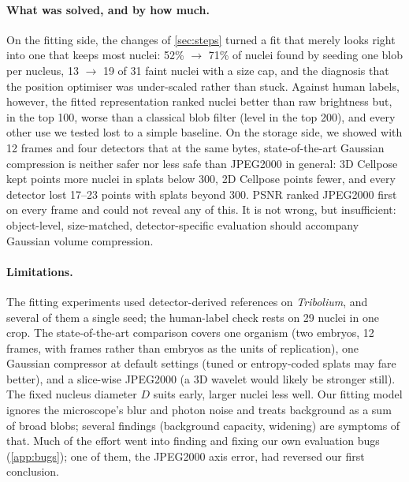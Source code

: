\documentclass[
  paper=a4,
  fontsize=11pt,
  english,
  numbers=noenddot,
  parskip=half,
  cdgeometry=symmetric,
  cd=barcolor,
  cdfont=false
]{tudscrartcl}
\begin{document}
\paragraph{What was solved, and by how much.} On the fitting side, the changes of
\cref{sec:steps} turned a fit that merely looks right into one that keeps most nuclei: 52\%
$\to$ 71\% of nuclei found by seeding one blob per nucleus, 13 $\to$ 19 of 31 faint nuclei with
a size cap, and the diagnosis that the position optimiser was under-scaled rather than stuck.
Against human labels, however, the fitted representation ranked nuclei better than raw
brightness but, in the top 100, worse than a classical blob filter (level in the top 200), and
every other use we tested lost to a simple baseline. On the storage side, we showed with 12 frames and four detectors that at the
same bytes, state-of-the-art Gaussian compression is neither safer nor less safe than JPEG2000
in general: 3D Cellpose kept \FrModCPthree{} points more nuclei in splats below
\SI{300}{\times}, 2D Cellpose \FrModCP{} points fewer, and every detector lost 17--23 points
with splats beyond \SI{300}{\times}. PSNR ranked JPEG2000 first on every frame and could not
reveal any of this. It is not wrong, but insufficient: object-level, size-matched,
detector-specific evaluation should accompany Gaussian volume compression.

\paragraph{Limitations.} The fitting experiments used detector-derived references on
\emph{Tribolium}, and several of them a single seed; the human-label check rests on 29 nuclei in
one crop. The state-of-the-art comparison covers one organism (two embryos, 12 frames, with
frames rather than embryos as the units of replication), one Gaussian compressor at default
settings (tuned or entropy-coded splats may fare better), and a slice-wise JPEG2000 (a 3D
wavelet would likely be stronger still). The fixed nucleus diameter $D$ suits early, larger
nuclei less well. Our fitting model ignores the microscope's blur and photon noise and treats
background as a sum of broad blobs; several findings (background capacity, widening) are
symptoms of that. Much of the effort went into finding and fixing our own evaluation bugs
(\cref{app:bugs}); one of them, the JPEG2000 axis error, had reversed our first conclusion.
\end{document}
